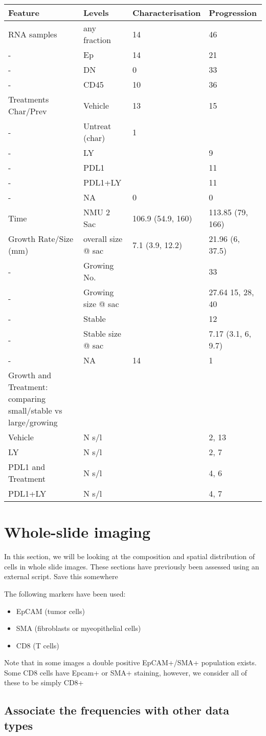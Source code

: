 \documentclass[
]{book}
\providecommand{\tightlist}{%
  \setlength{\itemsep}{0pt}\setlength{\parskip}{0pt}}
\begin{document}
\begin{longtable}[]{@{}llll@{}}
\toprule
Feature & Levels & Characterisation & Progression\tabularnewline
\midrule
\endhead
RNA samples & any fraction & 14 & 46\tabularnewline
- & Ep & 14 & 21\tabularnewline
- & DN & 0 & 33\tabularnewline
- & CD45 & 10 & 36\tabularnewline
Treatments Char/Prev & Vehicle & 13 & 15\tabularnewline
- & Untreat (char) & 1 &\tabularnewline
- & LY & & 9\tabularnewline
- & PDL1 & & 11\tabularnewline
- & PDL1+LY & & 11\tabularnewline
- & NA & 0 & 0\tabularnewline
Time & NMU 2 Sac & 106.9 (54.9, 160) & 113.85 (79, 166)\tabularnewline
Growth Rate/Size (mm) & overall size @ sac & 7.1 (3.9, 12.2) & 21.96 (6, 37.5)\tabularnewline
- & Growing No. & & 33\tabularnewline
- & Growing size @ sac & & 27.64 15, 28, 40\tabularnewline
- & Stable & & 12\tabularnewline
- & Stable size @ sac & & 7.17 (3.1, 6, 9.7)\tabularnewline
- & NA & 14 & 1\tabularnewline
Growth and Treatment: comparing small/stable vs large/growing & & &\tabularnewline
Vehicle & N s/l & & 2, 13\tabularnewline
LY & N s/l & & 2, 7\tabularnewline
PDL1 and Treatment & N s/l & & 4, 6\tabularnewline
PDL1+LY & N s/l & & 4, 7\tabularnewline
\bottomrule
\end{longtable}

\hypertarget{whole-slide-imaging}{%
\chapter{Whole-slide imaging}\label{whole-slide-imaging}}

In this section, we will be looking at the composition and spatial distribution of cells in whole slide images. These sections have previously been assessed using an {external script. Save this somewhere }

The following markers have been used:

\begin{itemize}
\tightlist
\item
  EpCAM (tumor cells)
\item
  SMA (fibroblasts or myeopithelial cells)
\item
  CD8 (T cells)
\end{itemize}

Note that in some images a double positive EpCAM+/SMA+ population exists. Some CD8 cells have Epcam+ or SMA+ staining, however, we consider all of these to be simply CD8+

\hypertarget{associate-the-frequencies-with-other-data-types}{%
\section{Associate the frequencies with other data types}\label{associate-the-frequencies-with-other-data-types}}
\end{document}
